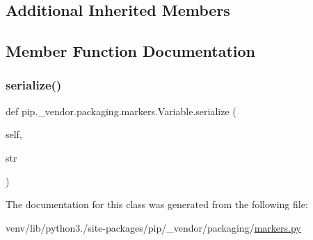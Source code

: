 \subsection*{Additional Inherited Members}


\subsection{Member Function Documentation}
\mbox{\label{classpip_1_1__vendor_1_1packaging_1_1markers_1_1Variable_a99f75fd157ee78c08d4728266c45d775}} 
\subsubsection{\texorpdfstring{serialize()}{serialize()}}
{\footnotesize\ttfamily def pip.\+\_\+vendor.\+packaging.\+markers.\+Variable.\+serialize (\begin{DoxyParamCaption}\item[{}]{self,  }\item[{}]{str }\end{DoxyParamCaption})}



The documentation for this class was generated from the following file\+:\begin{DoxyCompactItemize}
\item 
venv/lib/python3./site-\/packages/pip/\+\_\+vendor/packaging/\hyperlink{pip_2__vendor_2packaging_2markers_8py}{markers.\+py}\end{DoxyCompactItemize}
